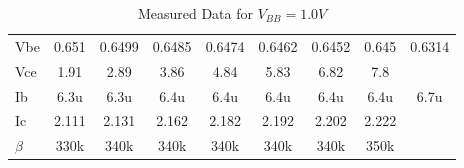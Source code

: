 \begin{table}[H]
\begin{tabular}{ccccccccc}
        \multicolumn{1}{l|}{Vbe}     & \multicolumn{1}{c}{0.651}  & \multicolumn{1}{c}{0.6499} & \multicolumn{1}{c}{0.6485} & \multicolumn{1}{c}{0.6474} & \multicolumn{1}{c}{0.6462} & \multicolumn{1}{c}{0.6452} & \multicolumn{1}{c}{0.645} & 0.6314 \\
        \multicolumn{1}{l|}{Vce}     & \multicolumn{1}{c}{1.91}   & \multicolumn{1}{c}{2.89}   & \multicolumn{1}{c}{3.86}   & \multicolumn{1}{c}{4.84}   & \multicolumn{1}{c}{5.83}   & \multicolumn{1}{c}{6.82}   & \multicolumn{1}{c}{7.8}   &        \\
        \multicolumn{1}{l|}{Ib}      & \multicolumn{1}{c}{6.3u}   & \multicolumn{1}{c}{6.3u}   & \multicolumn{1}{c}{6.4u}   & \multicolumn{1}{c}{6.4u}   & \multicolumn{1}{c}{6.4u}   & \multicolumn{1}{c}{6.4u}   & \multicolumn{1}{c}{6.4u}  & 6.7u   \\
        \multicolumn{1}{l|}{Ic}      & \multicolumn{1}{c}{2.111}  & \multicolumn{1}{c}{2.131}  & \multicolumn{1}{c}{2.162}  & \multicolumn{1}{c}{2.182}  & \multicolumn{1}{c}{2.192}  & \multicolumn{1}{c}{2.202}  & \multicolumn{1}{c}{2.222} &        \\
        \multicolumn{1}{l|}{$\beta$} & \multicolumn{1}{c}{330k}   & \multicolumn{1}{c}{340k}   & \multicolumn{1}{c}{340k}   & \multicolumn{1}{c}{340k}   & \multicolumn{1}{c}{340k}   & \multicolumn{1}{c}{340k}   & \multicolumn{1}{c}{350k}  &        \\
        \midrule
        \end{tabular}
        \caption{Measured Data for $V_{BB}=1.0V$}
        \end{table}


